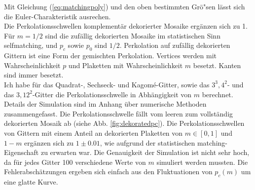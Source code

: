 Mit Gleichung (\ref{eq:matchingpoly}) und den oben bestimmten Gr\"o"sen l\"asst sich die Euler-Charakteristik ausrechen.
\\Die Perkolationsschwellen komplement\"ar dekorierter Mosaike erg\"anzen sich zu 1. F\"ur $m=1/2$ sind die zuf\"allig dekorierten Mosaike im statistischen Sinn selfmatching, und $p_c$ sowie $p_0$ sind $1/2$. Perkolation auf zuf\"allig dekorierten Gittern ist eine Form der gemischten Perkolation. Vertices werden mit Wahrscheinlichkeit $p$ und Plaketten mit Wahrscheinlichkeit $m$ besetzt. Kanten sind immer besetzt.\\
Ich habe f\"ur das Quadrat-, Sechseck- und Kagom\'e-Gitter, sowie das $3^3,4^2$- und das $3,12^2$-Gitter die Perkolationsschwelle in Abh\"angigkeit von $m$ berechnet. Details der Simulation sind im Anhang \"uber numerische Methoden zusammengefasst. Die Perkolationsschwelle f\"allt vom leeren zum vollst\"andig dekorierten Mosaik ab (siehe Abb. \ref{fig:dekoratedpc}). Die Perkolationsschwellen von Gittern mit einem Anteil an dekorierten Plaketten von $m\in[0,1]$ und $1-m$ erg\"anzen sich zu $1\pm 0.01$, wie aufgrund der statistischen matching-Eigenschaft zu erwarten war. Die Genauigkeit der Simulation ist nicht sehr hoch, da f\"ur jedes Gitter 100 verschiedene Werte von $m$ simuliert werden mussten. Die Fehlerabsch\"atzungen ergeben sich einfach aus den Fluktuationen von $p_c(m)$ um eine glatte Kurve.
